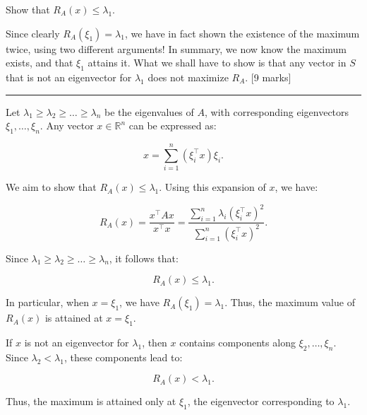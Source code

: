 \documentclass{article}
\begin{document}
\begin{enumerate}
    Show that \( R_A(x) \leq \lambda_1 \). 
    \vspace{0.5em}

    \noindent Since clearly \( R_A(\xi_1) = \lambda_1 \), we have in fact shown the existence of the maximum twice, using two different arguments! In summary, we now know the maximum exists, and that \( \xi_1 \) attains it. What we shall have to show is that any vector in \( S \) that is not an eigenvector for \( \lambda_1 \) does not maximize \( R_A \). [9 marks]
       
    \noindent\textcolor{gray}{\rule{0.1\linewidth}{0.4pt}}
    \vspace{10pt}
    
    Let \( \lambda_1 \geq \lambda_2 \geq \dots \geq \lambda_n \) be the eigenvalues of \( A \), with corresponding eigenvectors \( \xi_1, \dots, \xi_n \). Any vector \( x \in \mathbb{R}^n \) can be expressed as:

    \begin{equation}
    x = \sum_{i=1}^n (\xi_i^\top x) \xi_i.
    \end{equation}
    
    We aim to show that \( R_A(x) \leq \lambda_1 \). Using this expansion of \( x \), we have:
    
    \begin{equation}
    R_A(x) = \frac{x^\top A x}{x^\top x} = \frac{\sum_{i=1}^n \lambda_i (\xi_i^\top x)^2}{\sum_{i=1}^n (\xi_i^\top x)^2}.
    \end{equation}
    
    Since \( \lambda_1 \geq \lambda_2 \geq \dots \geq \lambda_n \), it follows that:
    
    \begin{equation}
    R_A(x) \leq \lambda_1.
    \end{equation}
    
    In particular, when \( x = \xi_1 \), we have \( R_A(\xi_1) = \lambda_1 \). Thus, the maximum value of \( R_A(x) \) is attained at \( x = \xi_1 \).
    
    \noindent If \( x \) is not an eigenvector for \( \lambda_1 \), then \( x \) contains components along \( \xi_2, \dots, \xi_n \). Since \( \lambda_2 < \lambda_1 \), these components lead to:
    
    \begin{equation}
    R_A(x) < \lambda_1.
    \end{equation}
    
    Thus, the maximum is attained only at \( \xi_1 \), the eigenvector corresponding to \( \lambda_1 \).


\end{enumerate}
\end{document}
